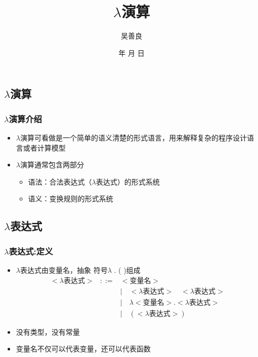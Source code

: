 \documentclass[CJKutf8,compress,hyperref]{beamer}
\renewcommand{\today}{\number\year 年 \number\month 月 \number\day 日}
\begin{document}
\begin{CJK}{UTF8}{song}
 
\title{ $\lambda$演算}
\author{ 吴善良}
\date{ \today}

\frame{\titlepage}
\tableofcontents
\section{ $\lambda$演算}

\begin{frame}
  \frametitle{ $\lambda$演算介绍}
  \begin{itemize}
  \item $\lambda$演算可看做是一个简单的语义清楚的形式语言，用来解释复杂的程序设计语言或者计算模型
  \item $\lambda$演算通常包含两部分
    \begin{itemize} 
    \item{语法}：合法表达式（{\color{red}$\lambda$}表达式）的形式系统
    \item{语义}：变换规则的形式系统
    \end{itemize}
  \end{itemize}
\end{frame}

\subsection{  $\lambda$表达式}

\begin{frame}
  \frametitle{ $\lambda$表达式:定义}
  \begin{itemize}
  \item $\lambda$表达式由变量名，抽象
    符号$\lambda$ . ( )组成 
    \begin{eqnarray}
      <\textrm{$\lambda$表达式}> & ::= & <\textrm{变量名}> \\
                                 & & \mid\quad <\textrm{$\lambda$表达式}>\quad<\textrm{$\lambda$表达式}> \\ 
                                 & & \mid\quad \lambda<\textrm{变量名}>.<\textrm{$\lambda$表达式}> \\
                                 & & \mid\quad (<\textrm{$\lambda$表达式}>)
    \end{eqnarray}    
  \item 没有类型，没有常量 
  \item 变量名不仅可以代表变量，还可以代表{\color{blue}函数}
  \end{itemize}
\end{frame}


\end{CJK}
\end{document}
